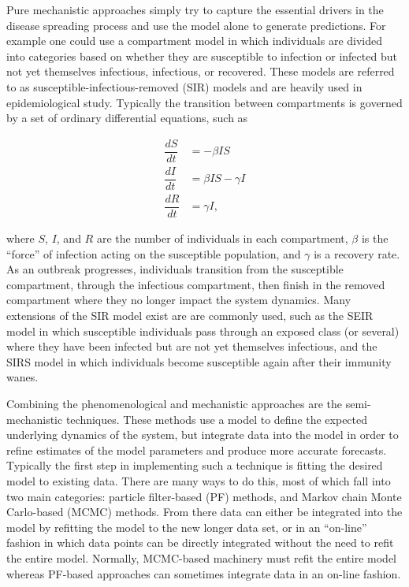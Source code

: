 Pure mechanistic approaches simply try to capture the essential drivers in the disease spreading process and use the model alone to generate predictions. For example one could use a compartment model in which individuals are divided into categories based on whether they are susceptible to infection or infected but not yet themselves infectious, infectious, or recovered. These models are referred to as susceptible-infectious-removed (SIR) models and are heavily used in epidemiological study. Typically the transition between compartments is governed by a set of ordinary differential equations, such as 

\begin{equation}
    \begin{array}{rl}
        \dfrac{dS}{dt} & = - \beta I S \\
        \dfrac{dI}{dt} & = \beta I S - \gamma I  \\
        \dfrac{dR}{dt} & = \gamma I,
    \end{array}
\end{equation}

where $S$, $I$, and $R$ are the number of individuals in each compartment, $\beta$ is the ``force'' of infection acting on the susceptible population, and $\gamma$ is a recovery rate. As an outbreak progresses, individuals transition from the susceptible compartment, through the infectious compartment, then finish in the removed compartment where they no longer impact the system dynamics. Many extensions of the SIR model exist are are commonly used, such as the SEIR model in which susceptible individuals pass through an exposed class (or several) where they have been infected but are not yet themselves infectious, and the SIRS model in which individuals become susceptible again after their immunity wanes.

Combining the phenomenological and mechanistic approaches are the semi-mechanistic techniques. These methods use a model to define the expected underlying dynamics of the system, but integrate data into the model in order to refine estimates of the model parameters and produce more accurate forecasts. Typically the first step in implementing such a technique is fitting the desired model to existing data. There are many ways to do this, most of which fall into two main categories: particle filter-based (PF) methods, and Markov chain Monte Carlo-based (MCMC) methods. From there data can either be integrated into the model by refitting the model to the new longer data set, or in an ``on-line'' fashion in which data points can be directly integrated without the need to refit the entire model. Normally, MCMC-based machinery must refit the entire model whereas PF-based approaches can sometimes integrate data in an on-line fashion.

